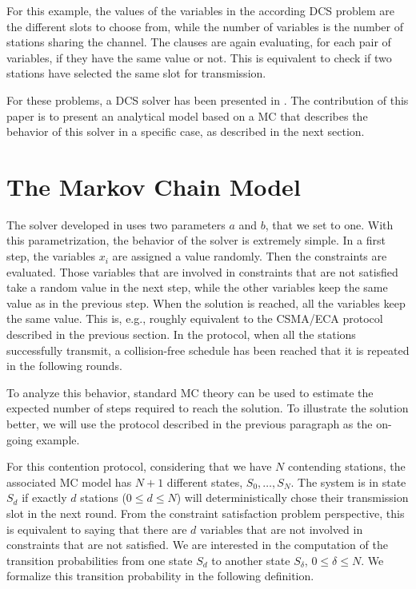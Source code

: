 \documentclass[journal]{IEEEtran}
\begin{document}
For this example, the values of the variables in the according DCS problem are the different slots to choose from, while the number of variables is the number of stations sharing the channel. The clauses are again evaluating, for each pair of variables, if they have the same value or not.
This is equivalent to check if two stations have selected the same slot for transmission.

For these problems, a DCS solver has been presented in \cite{duffy2011dcs}. The contribution of this paper is to present an analytical model based on a MC that describes the behavior of this solver in a specific case, as described in the next section.

\section{The Markov Chain Model}
\label{sec:markov_chain}

The solver developed in \cite{duffy2011dcs} uses two parameters $a$ and $b$, that we set to one. With this parametrization, the behavior of the solver is extremely simple.
In a first step, the variables $x_i$ are assigned a value randomly. Then the constraints are evaluated.
Those variables that are involved in constraints that are not satisfied take a random value in the next step, while the other variables keep the same value as in the previous step.
When the solution is reached, all the variables keep the same value.
This is, e.g., roughly equivalent to the CSMA/ECA protocol described in the previous section.
In the protocol, when all the stations successfully transmit, a collision-free schedule has been reached that it is repeated in the following rounds.

To analyze this behavior, standard MC theory can be used to estimate the expected number of steps required to reach the solution. To illustrate the solution better, we will use the protocol described in the previous paragraph as the on-going example.

For this contention protocol, considering that we have $N$ contending stations, the associated MC model has $N+1$ different states, $S_0, \dots, S_N$.
The system is in state $S_d$ if exactly $d$ stations ($0 \leq d \leq N$) will deterministically chose their transmission slot in the next round.
From the constraint satisfaction problem perspective, this is equivalent to saying that there are $d$ variables that are not involved in constraints that are not satisfied.
We are interested in the computation of the transition probabilities from one state $S_d$ to another state $S_\delta$, $0 \leq \delta \leq N$.
We formalize this transition probability in the following definition.
\end{document}
